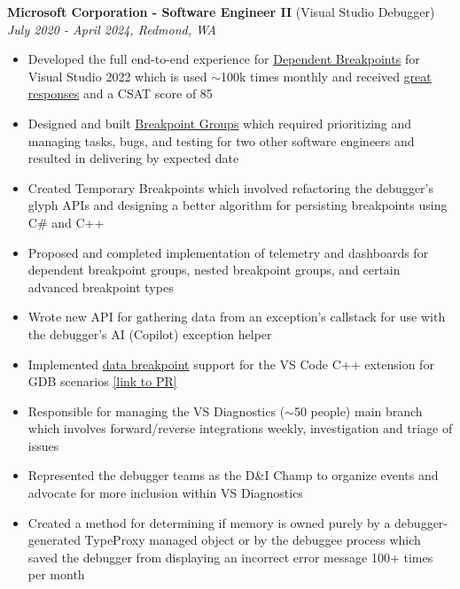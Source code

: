 \documentclass{article}
\begin{document}
\noindent \normalsize \textbf{Microsoft Corporation - Software Engineer II} \footnotesize (Visual Studio Debugger) \hfill \small \textit{July 2020 - April 2024, Redmond, WA}
\begin{itemize}
    \item Developed the full end-to-end experience for \href{https://learn.microsoft.com/en-us/visualstudio/debugger/using-breakpoints?view=vs-2022#BKMK_set_a_dependent_breakpoint}{Dependent Breakpoints} for Visual Studio 2022 which is used $\sim$100k times monthly and received \href{https://twitter.com/VS_Debugger/status/1437902110822047750}{great responses} and a CSAT score of 85
    \item Designed and built \href{https://devblogs.microsoft.com/visualstudio/streamlining-your-debugging-process-with-breakpoint-groups/}{Breakpoint Groups} which required prioritizing and managing tasks, bugs, and testing for two other software engineers and resulted in delivering by expected date 
    \item Created Temporary Breakpoints which involved refactoring the debugger's glyph APIs and designing a better algorithm for persisting breakpoints using C\# and C++
    \item Proposed and completed implementation of telemetry and dashboards for dependent breakpoint groups, nested breakpoint groups, and certain advanced breakpoint types
    \item Wrote new API for gathering data from an exception's callstack for use with the debugger's AI (Copilot) exception helper
    \item Implemented \href{https://devblogs.microsoft.com/cppblog/whats-new-for-c-debugging-in-visual-studio-code/#data-breakpoints}{data breakpoint} support for the VS Code C++ extension for GDB scenarios \href{https://github.com/microsoft/MIEngine/pull/1257}{[link to PR]}
    \item Responsible for managing the VS Diagnostics ($\sim$50 people) main branch which involves forward/reverse integrations weekly, investigation and triage of issues
    \item Represented the debugger teams as the D\&I Champ to organize events and advocate for more inclusion within VS Diagnostics
    \item Created a method for determining if memory is owned purely by a debugger-generated TypeProxy managed object or by the debuggee process which saved the debugger from displaying an incorrect error message 100+ times per month
\end{itemize}
\end{document}
